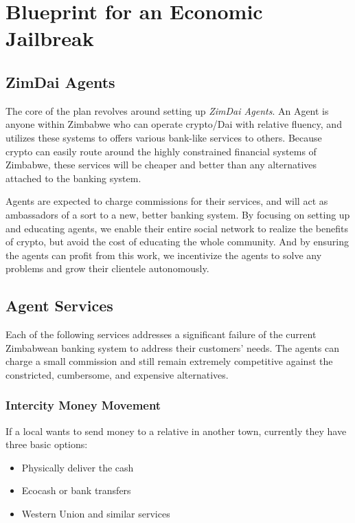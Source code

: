 \documentclass{article}
\begin{document}
\newpage
\section{Blueprint for an Economic Jailbreak}  \label{blueprint}
\subsection{ZimDai Agents} \label{agents}

The core of the plan revolves around setting up \textit{ZimDai Agents}. An Agent is anyone within Zimbabwe who can operate crypto/Dai with relative fluency, and utilizes these systems to offers various bank-like services to others. Because crypto can easily route around the highly constrained financial systems of Zimbabwe, these services will be cheaper and better than any alternatives attached to the banking system.

Agents are expected to charge commissions for their services, and will act as ambassadors of a sort to a new, better banking system. By focusing on setting up and educating agents, we enable their entire social network to realize the benefits of crypto, but avoid the cost of educating the whole community. And by ensuring the agents can profit from this work, we incentivize the agents to solve any problems and grow their clientele autonomously.

\subsection{Agent Services} \label{services}

Each of the following services addresses a significant failure of the current Zimbabwean banking system to address their customers' needs. The agents can charge a small commission and still remain extremely competitive against the constricted, cumbersome, and expensive alternatives.

\subsubsection{Intercity Money Movement} \label{intercity}

If a local wants to send money to a relative in another town, currently they have three basic options:

\begin{itemize}
	\item Physically deliver the cash
	\item Ecocash or bank transfers
	\item Western Union and similar services
\end{itemize}	
\end{document}
